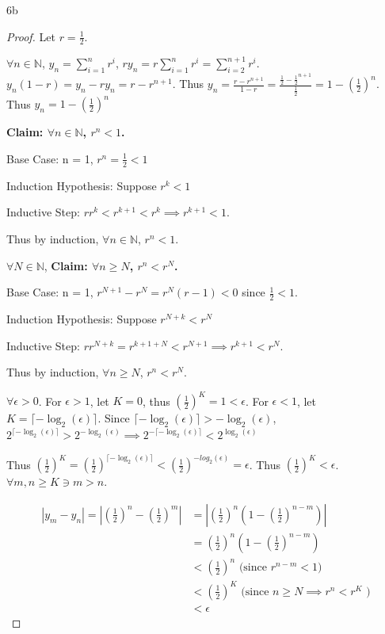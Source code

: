 \documentclass{article}
\newcommand{\N}{\mathbb{N}}
\newcommand{\abs}[1]{\left\lvert#1\right\rvert}
\newcommand{\ceil}[1]{\lceil{#1}\rceil}
\begin{document}
\begin{PROB}{6b}\label{Problem 6b.}
\end{PROB}
\begin{proof}
    Let $r = \frac{1}{2}$. 
    
    $\forall n \in \N$, $y_n = \sum_{i = 1}^{n} r^i$, $ry_n = r\sum_{i = 1}^{n}r^{i} = \sum_{i = 2}^{n + 1} r^{i}$. $y_n(1 - r) = y_n - ry_n = r - r^{n + 1}$. Thus $y_n = \frac{r - r^{n + 1}}{1 - r} = \frac{\frac{1}{2} - \frac{1}{2}^{n + 1}}{\frac{1}{2}} = 1 - \left(\frac{1}{2}\right)^n$. Thus $y_n = 1 - \left(\frac{1}{2}\right)^n$ 


    \textbf{Claim: $\forall n \in \N$, $r^n < 1$.}   

    Base Case: n = 1, $r^n = \frac{1}{2} < 1$

    Induction Hypothesis: Suppose $r^k < 1$

    Inductive Step: $r r^k < r^{k + 1} < r^k \implies r^{k + 1} < 1$. 
    
    Thus by induction, $\forall n \in \N$, $r^n < 1$.  
    
    $\forall N \in \N$, 
    \textbf{Claim: $\forall n \geq N$, $r^n < r^N$.}

    Base Case: n = 1, $r^{N + 1} - r^N = r^{N}(r - 1) < 0$ since $\frac{1}{2} < 1$.

    Induction Hypothesis: Suppose $r^{N + k} < r^N$

    Inductive Step: $r r^{N + k} = r^{k + 1 + N} < r^{N + 1} \implies r^{k + 1} < r^N$. 
    
    Thus by induction, $\forall n \geq N$, $r^n < r^N$. 
             

    $\forall \epsilon > 0$. For $\epsilon > 1$, let $K = 0$, thus $\left(\frac{1}{2}\right)^K = 1 < \epsilon$. For $\epsilon < 1$, let $K = \ceil{-\log_2(\epsilon)}$. Since $\ceil{-\log_2(\epsilon)} > -\log_2(\epsilon)$, $2^{\ceil{-\log_2(\epsilon)}} > 2^{-\log_2(\epsilon)} \implies 2^{-\ceil{-\log_2(\epsilon)}} < 2^{\log_2(\epsilon)}$  
    
    
    Thus $\left(\frac{1}{2}\right)^K = \left(\frac{1}{2}\right)^{\ceil{-\log_2(\epsilon)}} < \left(\frac{1}{2}\right)^{-log_2(\epsilon)} = \epsilon$. Thus $\left(\frac{1}{2}\right)^K < \epsilon$. $\forall m , n \geq K \ni m > n$.              
    
    \begin{align*}
        \abs{y_m - y_n} = \abs{\left(\frac{1}{2}\right)^n - \left(\frac{1}{2}\right)^m} &= \abs{\left(\frac{1}{2}\right)^n \left(1 - \left(\frac{1}{2}\right)^{n - m}\right)} \\
        &= \left(\frac{1}{2}\right)^n \left(1 - \left(\frac{1}{2}\right)^{n - m}\right) \\
        &< \left(\frac{1}{2}\right)^n \text{ (since $r^{n - m} < 1$)}\\ 
        &< \left(\frac{1}{2}\right)^K \text{ (since $n \geq N \implies r^n < r^K$ )} \\
        &< \epsilon
    \end{align*}
\end{proof}
\end{document}
